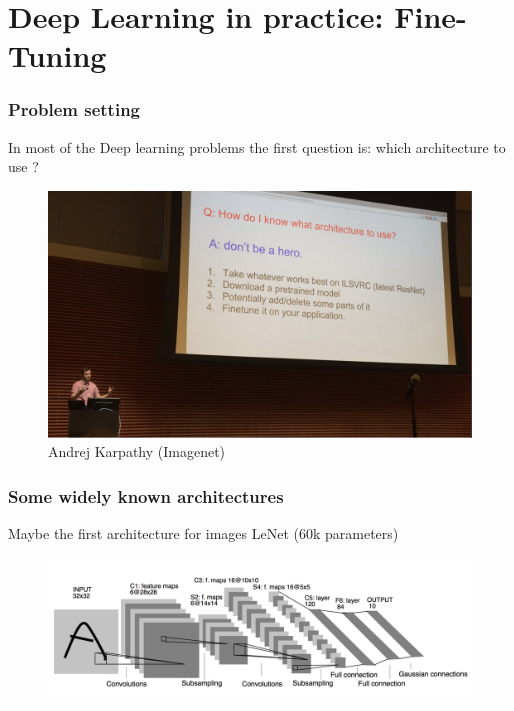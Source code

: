 \documentclass[french,9pt]{beamer}
\begin{document}

\section{Deep Learning in practice: Fine-Tuning}


\begin{frame}
\frametitle{Problem setting}

In most of the Deep learning problems the first question is: which architecture to use ?

\begin{figure}
  \begin{center}
    \includegraphics[width=1\textwidth]{fig/dont_be_a_hero.png}
    \caption{Andrej Karpathy (Imagenet)}
  \end{center}
\end{figure}


\end{frame}


\begin{frame}
\frametitle{Some widely known architectures}

Maybe the first architecture for images LeNet (60k parameters) \cite{LeCun1989} 

\begin{figure}
  \begin{center}
    \includegraphics[width=1\textwidth]{fig/conv_lecun.png}
  \end{center}
\end{figure}


\end{frame}
\end{document}
